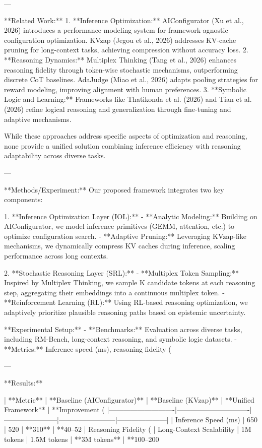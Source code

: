 ---

**Related Work:**  
1. **Inference Optimization:** AIConfigurator (Xu et al., 2026) introduces a performance-modeling system for framework-agnostic configuration optimization. KVzap (Jegou et al., 2026) addresses KV-cache pruning for long-context tasks, achieving compression without accuracy loss.  
2. **Reasoning Dynamics:** Multiplex Thinking (Tang et al., 2026) enhances reasoning fidelity through token-wise stochastic mechanisms, outperforming discrete CoT baselines. AdaJudge (Miao et al., 2026) adapts pooling strategies for reward modeling, improving alignment with human preferences.  
3. **Symbolic Logic and Learning:** Frameworks like Thatikonda et al. (2026) and Tian et al. (2026) refine logical reasoning and generalization through fine-tuning and adaptive mechanisms.  

While these approaches address specific aspects of optimization and reasoning, none provide a unified solution combining inference efficiency with reasoning adaptability across diverse tasks.  

---

**Methods/Experiment:**  
Our proposed framework integrates two key components:  

1. **Inference Optimization Layer (IOL):**  
   - **Analytic Modeling:** Building on AIConfigurator, we model inference primitives (GEMM, attention, etc.) to optimize configuration search.  
   - **Adaptive Pruning:** Leveraging KVzap-like mechanisms, we dynamically compress KV caches during inference, scaling performance across long contexts.  

2. **Stochastic Reasoning Layer (SRL):**  
   - **Multiplex Token Sampling:** Inspired by Multiplex Thinking, we sample K candidate tokens at each reasoning step, aggregating their embeddings into a continuous multiplex token.  
   - **Reinforcement Learning (RL):** Using RL-based reasoning optimization, we adaptively prioritize plausible reasoning paths based on epistemic uncertainty.  

**Experimental Setup:**  
- **Benchmarks:** Evaluation across diverse tasks, including RM-Bench, long-context reasoning, and symbolic logic datasets.  
- **Metrics:** Inference speed (ms), reasoning fidelity (%

---

**Results:**  

| **Metric**                | **Baseline (AIConfigurator)** | **Baseline (KVzap)** | **Unified Framework** | **Improvement (%
|----------------------------|-------------------------------|-----------------------|------------------------|---------------------|  
| Inference Speed (ms)      | 650                           | 520                   | **310**               | **40–52%
| Reasoning Fidelity (%
| Long-Context Scalability  | 1M tokens                     | 1.5M tokens           | **3M tokens**         | **100–200%

